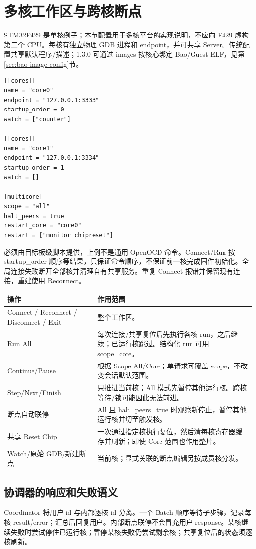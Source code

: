 \documentclass[UTF8,a4paper,11pt,oneside,fontset=none]{ctexart}
\newcommand{\code}[1]{\texttt{\detokenize{#1}}}
\newcommand{\newsection}[1]{\par\Needspace{10\baselineskip}\section{#1}}
\begin{document}
\newsection{多核工作区与跨核断点}\label{sec:multi}
STM32F429 是单核例子；本节配置用于多核平台的实现说明，不应向 F429 虚构第二个 CPU。每核有独立物理 GDB 进程和 endpoint，并可共享 Server。传统配置共享默认程序/描述；1.3.0 可通过 images 按核心绑定 Bao/Guest ELF，见第\ref{sec:bao-image-config}节。
\par\noindent\begin{minipage}{\linewidth}
\begin{lstlisting}
[[cores]]
name = "core0"
endpoint = "127.0.0.1:3333"
startup_order = 0
watch = ["counter"]

[[cores]]
name = "core1"
endpoint = "127.0.0.1:3334"
startup_order = 1
watch = []

[multicore]
scope = "all"
halt_peers = true
restart_core = "core0"
restart = ["monitor chipreset"]
\end{lstlisting}
\end{minipage}\par
\code{chipreset} 必须由目标板级脚本提供，上例不是通用 OpenOCD 命令。Connect/Run 按 startup\_order 顺序等结果，只保证命令顺序，不保证前一核完成固件初始化。全局连接失败断开全部核并清理自有共享服务。重复 Connect 报错并保留现有连接，重建使用 Reconnect。

\noindent\begin{tabularx}{\linewidth}{@{}P{37mm}Y@{}}\toprule
操作 & 作用范围\\\midrule
Connect / Reconnect / Disconnect / Exit & 整个工作区。\\
Run All & 每次连接/共享复位后先执行各核 run，之后继续；已运行核跳过。结构化 run 可用 scope=core。\\
Continue/Pause & 根据 Scope All/Core；单请求可覆盖 scope，不改变会话默认范围。\\
Step/Next/Finish & 只推进当前核；All 模式先暂停其他运行核。跨核等待/锁可能因此无法前进。\\
断点自动联停 & All 且 halt\_peers=true 时观察新停止，暂停其他运行核并切至触发核。\\
共享 Reset Chip & 一次通过指定核执行复位，然后清每核寄存器缓存并刷新；即使 Core 范围也作用整片。\\
Watch/原始 GDB/新建断点 & 当前核；显式关联的断点编辑另按成员核分发。\\\bottomrule
\end{tabularx}

\subsection{协调器的响应和失败语义}
Coordinator 将用户 id 与内部逐核 id 分离。一个 Batch 顺序等待子步骤，记录每核 result/error；汇总后回复用户。内部断点联停不会冒充用户 response。某核继续失败时尝试停住已运行核；暂停某核失败仍尝试剩余核；共享复位后的状态须逐核刷新。
\end{document}
